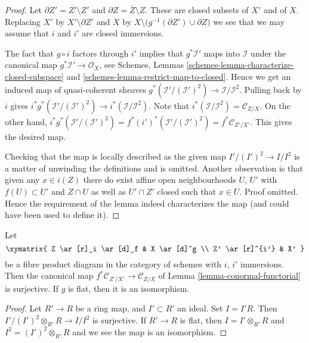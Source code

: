 \begin{proof}
Let $\partial Z' = \overline{Z'} \setminus Z'$ and
$\partial Z = \overline{Z} \setminus Z$. These are closed subsets of $X'$ and
of $X$. Replacing $X'$ by $X' \setminus \partial Z'$ and $X$ by
$X \setminus \big(g^{-1}(\partial Z') \cup \partial Z\big)$ we
see that we may assume that $i$ and $i'$ are closed immersions.

\medskip\noindent
The fact that $g \circ i$ factors through $i'$ implies that
$g^*\mathcal{I}'$ maps into $\mathcal{I}$ under the canonical
map $g^*\mathcal{I}' \to \mathcal{O}_X$, see
Schemes, Lemmas
\ref{schemes-lemma-characterize-closed-subspace} and
\ref{schemes-lemma-restrict-map-to-closed}.
Hence we get an induced map of quasi-coherent sheaves
$g^*(\mathcal{I}'/(\mathcal{I}')^2) \to \mathcal{I}/\mathcal{I}^2$.
Pulling back by $i$ gives
$i^*g^*(\mathcal{I}'/(\mathcal{I}')^2) \to i^*(\mathcal{I}/\mathcal{I}^2)$.
Note that $i^*(\mathcal{I}/\mathcal{I}^2) = \mathcal{C}_{Z/X}$.
On the other hand,
$i^*g^*(\mathcal{I}'/(\mathcal{I}')^2) =
f^*(i')^*(\mathcal{I}'/(\mathcal{I}')^2) = f^*\mathcal{C}_{Z'/X'}$.
This gives the desired map.

\medskip\noindent
Checking that the map is locally described as the given map
$I'/(I')^2 \to I/I^2$ is a matter of unwinding the definitions
and is omitted. Another observation is that given any
$x \in i(Z)$ there do exist affine open neighbourhoods $U$, $U'$
with $f(U) \subset U'$ and $Z \cap U$ as well as $U' \cap Z'$
closed such that $x \in U$. Proof omitted. Hence the requirement
of the lemma indeed characterizes the map (and could have been used
to define it).
\end{proof}

\begin{lemma}
\label{lemma-conormal-functorial-flat}
Let
$$
\xymatrix{
Z \ar[r]_i \ar[d]_f & X \ar[d]^g \\
Z' \ar[r]^{i'} & X'
}
$$
be a fibre product diagram in the category of schemes with
$i$, $i'$ immersions. Then the canonical map
$f^*\mathcal{C}_{Z'/X'} \to \mathcal{C}_{Z/X}$ of
Lemma \ref{lemma-conormal-functorial}
is surjective. If $g$ is flat, then it is an isomorphism.
\end{lemma}

\begin{proof}
Let $R' \to R$ be a ring map, and $I' \subset R'$ an ideal.
Set $I = I'R$. Then $I'/(I')^2 \otimes_{R'} R \to I/I^2$ is
surjective. If $R' \to R$ is flat, then $I = I' \otimes_{R'} R$
and $I^2 = (I')^2 \otimes_{R'} R$ and we see the map is an
isomorphism.
\end{proof}

